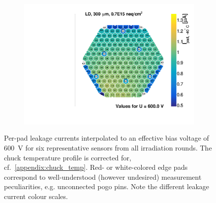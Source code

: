 \begin{figure}
\begin{subfigure}[b]{0.32\textwidth}
		\subcaption{
		}
		\label{plot:iv_hexplot_1013}
	\end{subfigure}
	\hfill
	\begin{subfigure}[b]{0.32\textwidth}
		\includegraphics[width=0.999\textwidth]{plots/iv_hexplots/1002.pdf}
		\subcaption{
		}
		\label{plot:iv_hexplot_1002}
	\end{subfigure}	
	\label{plot:iv_hexplot}
	\caption{
		Per-pad leakage currents interpolated to an effective bias voltage of \SI{600}{\volt} for six representative sensors from all irradiation rounds.
		The chuck temperature profile is corrected for, cf.~\ref{appendix:chuck_temp}.
		Red- or white-colored edge pads correspond to well-understood (however undesired) measurement peculiarities, e.g. unconnected pogo pins.
		Note the different leakage current colour scales.
	}
\end{figure}


